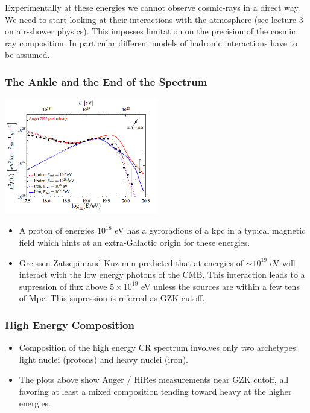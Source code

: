 \documentclass[
  letterpaper,
  DIV=11,
  numbers=noendperiod]{scrreprt}
\providecommand{\tightlist}{%
  \setlength{\itemsep}{0pt}\setlength{\parskip}{0pt}}\usepackage{longtable,booktabs,array}
\begin{document}
Experimentally at these energies we cannot observe cosmic-rays in a
direct way. We need to start looking at their interactions with the
atmosphere (see lecture 3 on air-shower physics). This imposses
limitation on the precision of the cosmic ray composition. In particular
different models of hadronic interactions have to be assumed.

\subsubsection{The Ankle and the End of the
Spectrum}\label{the-ankle-and-the-end-of-the-spectrum}

\begin{center}
\includegraphics[width=0.5\textwidth,height=\textheight]{images/ankle.png}
\end{center}

\begin{itemize}
\item
  A proton of energies \(10^{18}\) eV has a gyroradious of a kpc in a
  typical magnetic field which hints at an extra-Galactic origin for
  these energies.
\item
  Greissen-Zatsepin and Kuz-min predicted that at energies of
  \(\sim 10^{19}\) eV will interact with the low energy photons of the
  CMB. This interaction leads to a supression of flux above
  \(5\times10^{19}\) eV unless the sources are within a few tens of Mpc.
  This supression is referred as GZK cutoff.
\end{itemize}

\subsubsection{High Energy Composition}\label{high-energy-composition}

\begin{itemize}
\tightlist
\item
  Composition of the high energy CR spectrum involves only two
  archetypes: light nuclei (protons) and heavy nuclei (iron).
\item
  The plots above show Auger / HiRes measurements near GZK cutoff, all
  favoring at least a mixed composition tending toward heavy at the
  higher energies.
\end{itemize}
\end{document}
